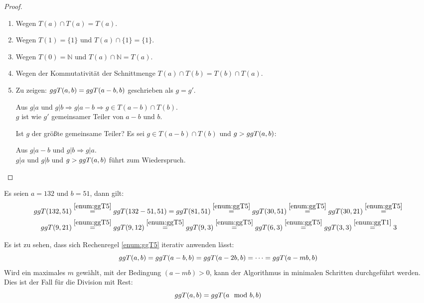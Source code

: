 \begin{proof}\mbox{}
  \begin{enumerate}
    \item Wegen $T(a) \cap T(a) = T(a)$.
    \item Wegen $T(1) = \{1\}$ und $T(a) \cap \{1\} = \{1\}$.
    \item Wegen $T(0) = \mathbb{N}$ und $T(a) \cap \mathbb{N} = T(a)$.
    \item Wegen der Kommutativität der Schnittmenge $T(a) \cap T(b) = T(b)\cap T(a)$.\newpage
    \item Zu zeigen: $ggT(a,b) = ggT(a - b,b)$ geschrieben als $g = g'$.
          \begin{center}
            Aus $ g|a$ und $g|b \Rightarrow g|a-b \Rightarrow g \in T(a-b) \cap T(b)$.\\
            $g$ ist wie $g'$ gemeinsamer Teiler von $a-b$ und $b$.
          \end{center}
          Ist $g$ der größte gemeinsame Teiler?
          Es sei $g \in T(a-b) \cap T(b)$ und $g > ggT(a,b)$:
          \begin{center}
            Aus $g|a-b$ und $g|b \Rightarrow g|a$.\\
            $g|a$ und $g|b$ und $g > ggT(a,b)$ führt zum Wiederspruch.
          \end{center}
  \end{enumerate}
\end{proof}

\begin{example}
  Es seien $a=132$ und $b=51$, dann gilt:
  \begin{align*}
    ggT(132,51) & \stackrel{\ref{enum:ggT5}}{=} ggT(132 - 51,51) =
    ggT(81,51) \stackrel{\ref{enum:ggT5}}{=} ggT(30,51) \stackrel{\ref{enum:ggT5}}{=}
    ggT(30,21) \stackrel{\ref{enum:ggT5}}{=}                                        \\
    ggT(9,21)   & \stackrel{\ref{enum:ggT5}}{=} ggT(9,12) \stackrel{\ref{enum:ggT5}}{=}
    ggT(9,3) \stackrel{\ref{enum:ggT5}}{=} ggT(6,3) \stackrel{\ref{enum:ggT5}}{=}
    ggT(3,3) \stackrel{\ref{enum:ggT1}}{=} 3
  \end{align*}
\end{example}

\noindent
Es ist zu sehen, dass sich Rechenregel \ref{enum:ggT5} iterativ anwenden lässt:
\begin{equation*}
  ggT(a,b) = ggT(a-b,b) = ggT(a-2b,b) = \dots = ggT(a-mb,b)
\end{equation*}
Wird ein maximales $m$ gewählt, mit der Bedingung $(a-mb) > 0$, kann der Algorithmus
in minimalen Schritten durchgeführt werden. Dies ist der Fall für die Division mit Rest:
\begin{equation*}
  ggT(a,b) = ggT(a \mod{b},b)
\end{equation*}

